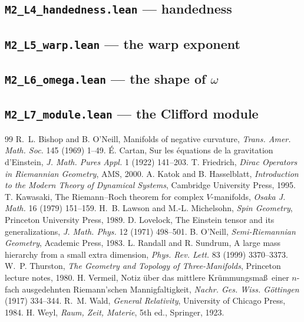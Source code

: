 \documentclass[11pt,a4paper]{article}
\theoremstyle{plain}
\theoremstyle{definition}
\theoremstyle{remark}
\begin{document}
\subsection*{\texttt{M2\_L4\_handedness.lean} --- handedness}


\subsection*{\texttt{M2\_L5\_warp.lean} --- the warp exponent}


\subsection*{\texttt{M2\_L6\_omega.lean} --- the shape of $\omega$}


\subsection*{\texttt{M2\_L7\_module.lean} --- the Clifford module}




\begin{thebibliography}{99}
 R.~L. Bishop and B. O'Neill, Manifolds of negative curvature, \emph{Trans. Amer. Math. Soc.} 145 (1969) 1--49.
 \'E. Cartan, Sur les \'equations de la gravitation d'Einstein, \emph{J. Math. Pures Appl.} 1 (1922) 141--203.
 T. Friedrich, \emph{Dirac Operators in Riemannian Geometry}, AMS, 2000.
 A. Katok and B. Hasselblatt, \emph{Introduction to the Modern Theory of Dynamical Systems}, Cambridge University Press, 1995.
 T. Kawasaki, The Riemann--Roch theorem for complex $V$-manifolds, \emph{Osaka J. Math.} 16 (1979) 151--159.
 H.~B. Lawson and M.-L. Michelsohn, \emph{Spin Geometry}, Princeton University Press, 1989.
 D. Lovelock, The Einstein tensor and its generalizations, \emph{J. Math. Phys.} 12 (1971) 498--501.
 B. O'Neill, \emph{Semi-Riemannian Geometry}, Academic Press, 1983.
 L. Randall and R. Sundrum, A large mass hierarchy from a small extra dimension, \emph{Phys. Rev. Lett.} 83 (1999) 3370--3373.
 W.~P. Thurston, \emph{The Geometry and Topology of Three-Manifolds}, Princeton lecture notes, 1980.
 H. Vermeil, Notiz \"uber das mittlere Kr\"ummungsma\ss\ einer $n$-fach ausgedehnten Riemann'schen Mannigfaltigkeit, \emph{Nachr. Ges. Wiss. G\"ottingen} (1917) 334--344.
 R.~M. Wald, \emph{General Relativity}, University of Chicago Press, 1984.
 H. Weyl, \emph{Raum, Zeit, Materie}, 5th ed., Springer, 1923.
\end{thebibliography}
\end{document}
